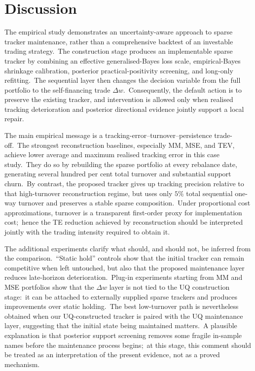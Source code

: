 \documentclass[11pt]{article}
\begin{document}
\section{Discussion}


The empirical study demonstrates an uncertainty-aware approach to sparse tracker maintenance, rather than a comprehensive backtest of an investable trading strategy.\ The construction stage produces an implementable sparse tracker by combining an effective generalised-Bayes loss scale, empirical-Bayes shrinkage calibration, posterior practical-positivity screening, and long-only refitting.\ The sequential layer then changes the decision variable from the full portfolio to the self-financing trade $\Delta w$.\ Consequently, the default action is to preserve the existing tracker, and intervention is allowed only when realised tracking deterioration and posterior directional evidence jointly support a local repair.

The main empirical message is a tracking-error--turnover--persistence trade-off.\ The strongest reconstruction baselines, especially MM, MSE, and TEV, achieve lower average and maximum realised tracking error in this case study.\ They do so by rebuilding the sparse portfolio at every rebalance date, generating several hundred per cent total turnover and substantial support churn.\ By contrast, the proposed tracker gives up tracking precision relative to that high-turnover reconstruction regime, but uses only $5\%$ total sequential one-way turnover and preserves a stable sparse composition.\ Under proportional cost approximations, turnover is a transparent first-order proxy for implementation cost;\ hence the TE reduction achieved by reconstruction should be interpreted jointly with the trading intensity required to obtain it.

The additional experiments clarify what should, and should not, be inferred from the comparison.\ ``Static hold'' controls show that the initial tracker can remain competitive when left untouched, but also that the proposed maintenance layer reduces late-horizon deterioration.\ Plug-in experiments starting from MM and MSE portfolios show that the $\Delta w$ layer is not tied to the UQ construction stage:\ it can be attached to externally supplied sparse trackers and produces improvements over static holding.\ The best low-turnover path is nevertheless obtained when our UQ-constructed tracker is paired with the UQ maintenance layer, suggesting that the initial state being maintained matters.\ A plausible explanation is that posterior support screening removes some fragile in-sample names before the maintenance process begins;\ at this stage, this comment should be treated as an interpretation of the present evidence, not as a proved mechanism.
\end{document}
